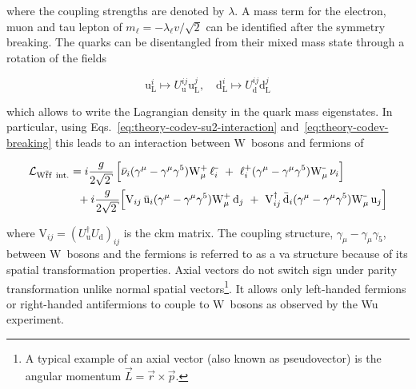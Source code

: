 where the coupling strengths are denoted by $\lambda$. A mass term for the electron, muon and tau lepton of $m_\ell=-\lambda_\ell v/\sqrt{2}$ can be identified after the symmetry breaking. The quarks can be disentangled from their mixed mass state through a rotation of the fields 

\begin{equation}
\mathrm{u}^{i}_\mathrm{L}\mapsto U^{ij}_\mathrm{u}\mathrm{u}^{j}_\mathrm{L},\quad \mathrm{d}^{i}_\mathrm{L}\mapsto U^{ij}_\mathrm{d}\mathrm{d}^{j}_\mathrm{L}
\end{equation}

which allows to write the Lagrangian density in the quark mass eigenstates. In particular, using Eqs.~\ref{eq:theory-codev-su2-interaction} and~\ref{eq:theory-codev-breaking} this leads to an interaction between $\mathrm{W}$~bosons and fermions of



\begin{align}
\mathcal{L}_{\mathrm{W}\bar{\mathrm{f}}\mathrm{f}~\mathrm{int.}}&=i\frac{g}{2\sqrt{2}}\,\Big[\bar{\nu}_{i}(\gamma^\mu-\gamma^\mu\gamma^5) \mathrm{W}^{\rmplus}_\mu\,\ell^{\rmminus}_{i}~+~{\ell}^{\rmplus}_{i}(\gamma^\mu-\gamma^\mu\gamma^5) \mathrm{W}^{\rmminus}_\mu\,\nu_{i}\Big]\\
&~~+i\frac{g}{2\sqrt{2}}\Big[\mathrm{V}_{ij}\,\bar{\mathrm{u}}_{i}(\gamma^\mu-\gamma^\mu\gamma^5) \mathrm{W}^{\rmplus}_\mu\,\mathrm{d}_{j}~+~\mathrm{V}_{ij}^\dagger\,\bar{\mathrm{d}}_{i}(\gamma^\mu-\gamma^\mu\gamma^5) \mathrm{W}^{\rmminus}_\mu\,\mathrm{u}_{j}\Big] \label{eq:theory-qqW-int}
\end{align}

where $\mathrm{V}_{ij}=(U^\dagger_\mathrm{u}U_\mathrm{d})_{ij}$ is the \gls{ckm} matrix.  
The coupling structure, $\gamma_{\mu}-\gamma_{\mu}\gamma_{5}$, between $\mathrm{W}$~bosons and the fermions is referred to as a \gls{va} structure because of its spatial transformation properties. Axial vectors do not switch sign under parity transformation  unlike normal spatial vectors\footnote{A typical example of an axial vector (also known as pseudovector) is the angular momentum $\vec{L}=\vec{r}\times \vec{p}$.}. It allows only left-handed fermions or right-handed antifermions to couple to $\mathrm{W}$~bosons as observed by the Wu experiment.





